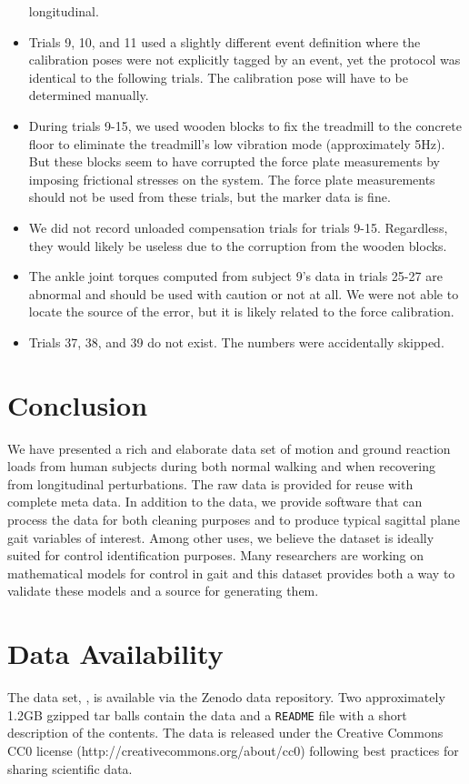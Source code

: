 \documentclass[fleqn,12pt]{wlpeerj}
\begin{document}
\begin{itemize}
    longitudinal.
  \item Trials 9, 10, and 11 used a slightly different event definition where the
    calibration poses were not explicitly tagged by an event, yet the protocol
    was identical to the following trials. The calibration pose will have to be
    determined manually.
  \item During trials 9-15, we used wooden blocks to fix the treadmill to the
    concrete floor to eliminate the treadmill's low vibration mode
    (approximately 5\si{\hertz}). But these blocks seem to have corrupted the
    force plate measurements by imposing frictional stresses on the system. The
    force plate measurements should not be used from these trials, but the
    marker data is fine.
  \item We did not record unloaded compensation trials for trials 9-15.
    Regardless, they would likely be useless due to the corruption from the
    wooden blocks.
  \item The ankle joint torques computed from subject 9's data in trials 25-27
    are abnormal and should be used with caution or not at all. We were not
    able to locate the source of the error, but it is likely related to the
    force calibration.
  \item Trials 37, 38, and 39 do not exist. The numbers were accidentally
    skipped.
\end{itemize}

\section*{Conclusion}
%
We have presented a rich and elaborate data set of motion and ground reaction
loads from human subjects during both normal walking and when recovering from
longitudinal perturbations. The raw data is provided for reuse with complete
meta data. In addition to the data, we provide software that can process the
data for both cleaning purposes and to produce typical sagittal plane gait
variables of interest. Among other uses, we believe the dataset is ideally
suited for control identification purposes. Many researchers are working on
mathematical models for control in gait and this dataset provides both a way to
validate these models and a source for generating them.

\section*{Data Availability}
%
The data set, \cite{Moore2014}, is available via the Zenodo data repository.
Two approximately 1.2GB gzipped tar balls contain the data and a \verb|README|
file with a short description of the contents. The data is released under the
Creative Commons CC0 license (http://creativecommons.org/about/cc0) following
best practices for sharing scientific data.
\end{document}
